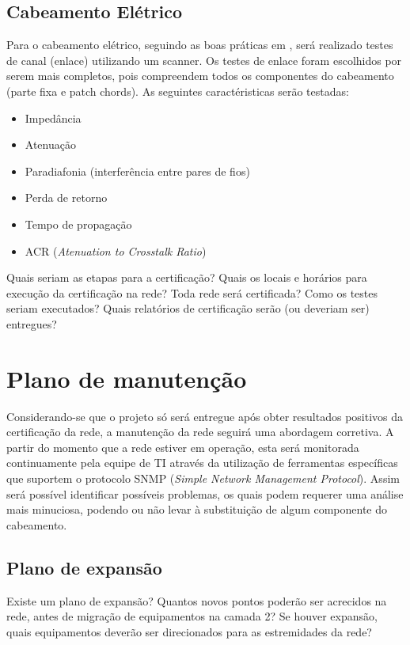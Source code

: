 \documentclass[	DIV=calc,%
							paper=a4,%
							fontsize=12pt,%
							onecolumn]{scrartcl}	 					%
\begin{document}
\subsection{Cabeamento Elétrico}
Para o cabeamento elétrico, seguindo as boas práticas em \cite{ref6}, será realizado testes de canal (enlace) utilizando um scanner.
Os testes de enlace foram escolhidos por serem mais completos, pois compreendem todos os componentes do cabeamento (parte fixa e patch chords).
As seguintes caractéristicas serão testadas:
\begin{itemize}
	\item Impedância
	\item Atenuação
	\item Paradiafonia (interferência entre pares de fios)
	\item Perda de retorno
	\item Tempo de propagação
	\item ACR (\textit{Atenuation to Crosstalk Ratio})
\end{itemize}

Quais seriam as etapas para a certificação? 
Quais os locais e horários para execução da certificação na rede? Toda rede será certificada?
Como os testes seriam executados?
Quais relatórios de certificação serão (ou deveriam ser) entregues? 

\section{Plano de manutenção}

Considerando-se que o projeto só será entregue após obter resultados positivos da certificação da rede, a manutenção da rede seguirá uma abordagem corretiva.
A partir do momento que a rede estiver em operação, esta será monitorada continuamente pela equipe de TI através da utilização de ferramentas específicas que suportem o protocolo SNMP (\textit{Simple Network Management Protocol}).
Assim será possível identificar possíveis problemas, os quais podem requerer uma análise mais minuciosa, podendo ou não levar à substituição de algum componente do cabeamento.


\subsection{Plano de expansão}
Existe um plano de expansão? Quantos novos pontos poderão ser acrecidos na rede, antes de migração de equipamentos na camada 2? Se houver expansão, quais equipamentos deverão ser direcionados para as estremidades da rede? 
\end{document}
